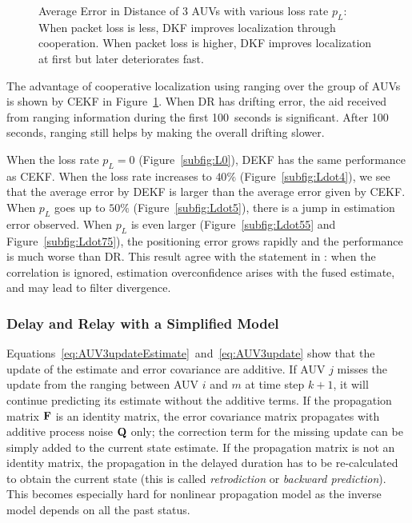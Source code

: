 \begin{figure}[htbp]
\centering
{}
\caption{Average Error in Distance of 3 AUVs with various loss rate $p_L$: When packet loss is less, DKF improves localization through cooperation. When packet loss is higher, DKF improves localization at first but later deteriorates fast.}
\label{fig:L}
\end{figure}

The advantage of cooperative localization using ranging over the group of AUVs is shown by CEKF in Figure~\ref{fig:L}. When DR has drifting error, the aid received from ranging information during the first 100~seconds is significant. After 100 seconds, ranging still helps by making the overall drifting slower.

When the loss rate $p_L=0$ (Figure~\ref{subfig:L0}), DEKF has the same performance as CEKF. When the loss rate increases to $40\%$ (Figure~\ref{subfig:Ldot4}), we see that the average error by DEKF is larger than the average error given by CEKF. When $p_L$ goes up to $50\%$ (Figure~\ref{subfig:Ldot5}), there is a jump in estimation error observed. When $p_L$ is even larger (Figure~\ref{subfig:Ldot55} and Figure~\ref{subfig:Ldot75}), the positioning error grows rapidly and the performance is much worse than DR. This result agree with the statement in \cite{Julier1997}: when the correlation is ignored, estimation overconfidence arises with the fused estimate, and may lead to filter divergence.

\subsubsection{Delay and Relay with a Simplified Model}

Equations~\eqref{eq:AUV3updateEstimate}~and~\eqref{eq:AUV3update} show that the update of the estimate and error covariance are additive. If AUV $j$ misses the update from the ranging between AUV $i$ and $m$ at time step $k+1$, it will continue predicting its estimate without the additive terms. If the propagation matrix ${\bf F}$ is an identity matrix, the error covariance matrix propagates with additive process noise $\bf Q$ only; the correction term for the missing update can be simply added to the current state estimate. If the propagation matrix is not an identity matrix, the propagation in the delayed duration has to be re-calculated to obtain the current state (this is called \textit{retrodiction} or \textit{backward prediction}). This becomes especially hard for nonlinear propagation model as the inverse model depends on all the past status.

